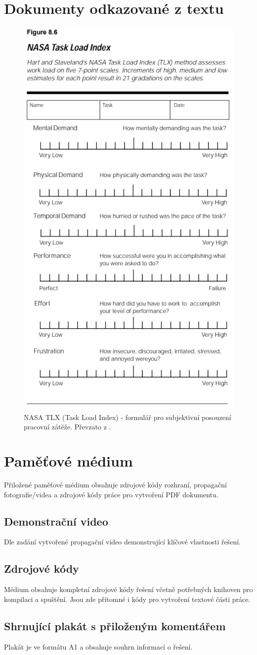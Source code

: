 \chapter{Dokumenty odkazované z textu}
\begin{figure}[ht]
    \centering
   \includegraphics[width=0.78\linewidth]{obrazky-figures/nasaTLXform.png}
  \caption{NASA TLX (Task Load Index) - formulář pro subjektivní posouzení pracovní zátěže. Převzato z \cite{NasaTlx}.}
  \label{pic-nasaTlxForm}
\end{figure}
\chapter{Paměťové médium}
Přiložené paměťové médium obsahuje zdrojové kódy rozhraní, propagační fotografie/videa a zdrojové kódy práce pro vytvoření PDF dokumentu.
\section{Demonstrační video}
Dle zadání vytvořené propagační video demonstrující klíčové vlastnosti řešení.
\section{Zdrojové kódy}
Médium obsahuje kompletní zdrojové kódy řešení včetně potřebných knihoven pro kompilaci a spuštění. Jsou zde přítomné i kódy pro vytvoření textové části práce.
\section{Shrnující plakát s přiloženým komentářem}
Plakát je ve formátu A1 a obsahuje souhrn informací o řešení.